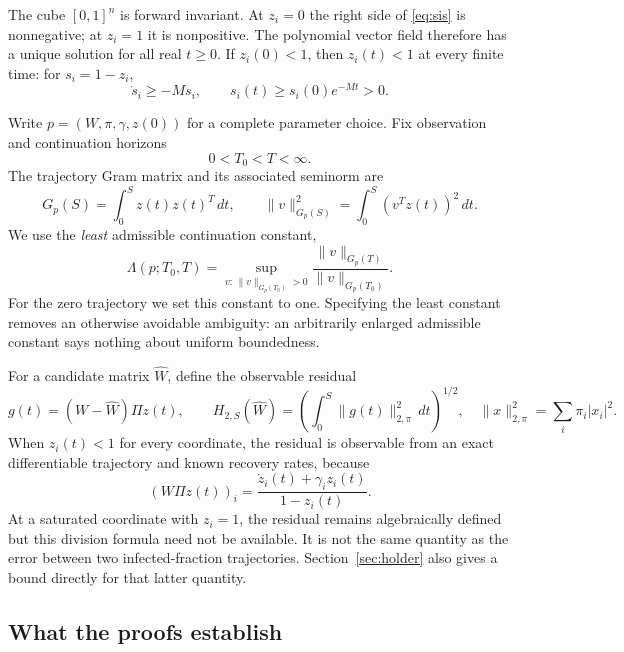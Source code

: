 The cube $[0,1]^n$ is forward invariant. At $z_i=0$ the right side of \eqref{eq:sis} is nonnegative; at $z_i=1$ it is nonpositive. The polynomial vector field therefore has a unique solution for all real $t\geq0$. If $z_i(0)<1$, then $z_i(t)<1$ at every finite time: for $s_i=1-z_i$,
\[
 \dot s_i\geq-Ms_i,\qquad s_i(t)\geq s_i(0)e^{-Mt}>0.
\]

Write $p=(W,\pi,\gamma,z(0))$ for a complete parameter choice. Fix
observation and continuation horizons
\[
 0<T_0<T<\infty.
\]
The trajectory Gram matrix and its associated seminorm are
\begin{equation}
 G_p(S)=\int_0^S z(t)z(t)^T\,dt,
 \qquad
 \|v\|_{G_p(S)}^2=\int_0^S(v^Tz(t))^2\,dt.
 \label{eq:gram}
\end{equation}
We use the \emph{least} admissible continuation constant,
\begin{equation}
 \Lambda(p;T_0,T)=
 \sup_{v:\,\|v\|_{G_p(T_0)}>0}
 \frac{\|v\|_{G_p(T)}}{\|v\|_{G_p(T_0)}}.
 \label{eq:lambda}
\end{equation}
For the zero trajectory we set this constant to one. Specifying the least constant removes an otherwise avoidable ambiguity: an arbitrarily enlarged admissible constant says nothing about uniform boundedness.

For a candidate matrix $\widehat W$, define the observable residual
\begin{equation}
 g(t)=(W-\widehat W)\Pi z(t),\qquad
 H_{2,S}(\widehat W)=
 \left(\int_0^S\|g(t)\|_{2,\pi}^2\,dt\right)^{1/2},
 \quad
 \|x\|_{2,\pi}^2=\sum_i\pi_i|x_i|^2.
 \label{eq:residual}
\end{equation}
When $z_i(t)<1$ for every coordinate, the residual is observable from an exact
differentiable trajectory and known recovery rates, because
\[
 (W\Pi z(t))_i=
 \frac{\dot z_i(t)+\gamma_i z_i(t)}{1-z_i(t)}.
\]
At a saturated coordinate with $z_i=1$, the residual remains algebraically
defined but this division formula need not be available. It is not the same
quantity as the error between two infected-fraction trajectories.
Section~\ref{sec:holder} also gives a bound directly for that latter quantity.

\subsection{What the proofs establish}

